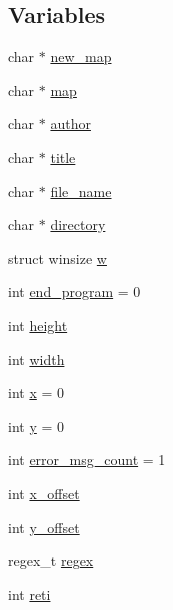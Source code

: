 \subsection*{Variables}
\begin{DoxyCompactItemize}
\item 
char $\ast$ \hyperlink{pacman-level-editor_8c_a3e0e8a927adf89de850b9bc86160819b}{new\-\_\-map}
\item 
char $\ast$ \hyperlink{pacman-level-editor_8c_a7b00b1bfd666e26484471bd17a74eaa9}{map}
\item 
char $\ast$ \hyperlink{pacman-level-editor_8c_a70d51dcba75e5d70d4708c7885550468}{author}
\item 
char $\ast$ \hyperlink{pacman-level-editor_8c_af06d911bb9e05f491ef3da520d03796c}{title}
\item 
char $\ast$ \hyperlink{pacman-level-editor_8c_a8505c513bc640d1f69e5f76fb32b24a8}{file\-\_\-name}
\item 
char $\ast$ \hyperlink{pacman-level-editor_8c_a8eadc6730ef4fbdae87a20414b789faf}{directory}
\item 
struct winsize \hyperlink{pacman-level-editor_8c_a114d2a5a196322c42d4cd57cccb1f43b}{w}
\item 
int \hyperlink{pacman-level-editor_8c_a1bee207ff2415ab72a1e22c86a93f100}{end\-\_\-program} = 0
\item 
int \hyperlink{pacman-level-editor_8c_ad12fc34ce789bce6c8a05d8a17138534}{height}
\item 
int \hyperlink{pacman-level-editor_8c_a2474a5474cbff19523a51eb1de01cda4}{width}
\item 
int \hyperlink{pacman-level-editor_8c_a6150e0515f7202e2fb518f7206ed97dc}{x} = 0
\item 
int \hyperlink{pacman-level-editor_8c_a0a2f84ed7838f07779ae24c5a9086d33}{y} = 0
\item 
int \hyperlink{pacman-level-editor_8c_ae0ebb9a2dde9db7a8070d03799386e18}{error\-\_\-msg\-\_\-count} = 1
\item 
int \hyperlink{pacman-level-editor_8c_a87147769c08c4f0fef7b0ec6077b338d}{x\-\_\-offset}
\item 
int \hyperlink{pacman-level-editor_8c_abaa275d8b2c76fd77dd271402a4425d3}{y\-\_\-offset}
\item 
regex\-\_\-t \hyperlink{pacman-level-editor_8c_a0f8fc8b8cd2ff33a04952c702504ccf4}{regex}
\item 
int \hyperlink{pacman-level-editor_8c_aefa902538b1cd5840102ccc807fe3f37}{reti}
\end{DoxyCompactItemize}


